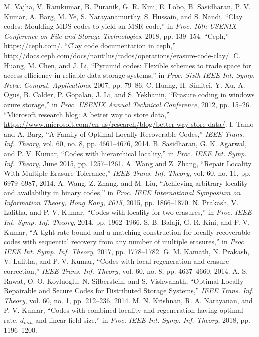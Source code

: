 \begin{multicols}{2}
\begin{thebibliography}{99}
 M. Vajha, V. Ramkumar, B. Puranik, G. R. Kini, E. Lobo, B. Sasidharan, P. V. Kumar, A. Barg, M. Ye, S. Narayanamurthy, S. Hussain, and S. Nandi, ``Clay codes: Moulding MDS codes to yield an MSR code,'' in \textit{Proc. 16th USENIX Conference on File and Storage Technologies}, 2018, pp. 139--154.
 ``Ceph,'' \url{https://ceph.com/}.
 ``Clay code documentation in ceph,'' \url{http://docs.ceph.com/docs/nautilus/rados/operations/erasure-code-clay/}.
 C. Huang, M. Chen, and J. Li, ``Pyramid codes: Flexible schemes to trade space for access efficiency in reliable data storage systems,'' in \textit{Proc. Sixth IEEE Int. Symp. Netw. Comput. Applications}, 2007, pp. 79--86.
 C. Huang, H. Simitci, Y. Xu, A. Ogus, B. Calder, P. Gopalan, J. Li, and S. Yekhanin, ``Erasure coding in windows azure storage,'' in \textit{Proc. USENIX Annual Technical Conference}, 2012, pp. 15--26.
 ``Microsoft research blog: A better way to store data,'' \url{https://www.microsoft.com/en-us/research/blog/better-way-store-data/}.
 I. Tamo and A. Barg, ``A Family of Optimal Locally Recoverable Codes,'' \textit{IEEE Trans. Inf. Theory}, vol. 60, no. 8, pp. 4661--4676, 2014.
 B. Sasidharan, G. K. Agarwal, and P. V. Kumar, ``Codes with hierarchical locality,'' in \textit{Proc. IEEE Int. Symp. Inf. Theory}, June 2015, pp. 1257--1261.
 A. Wang and Z. Zhang, ``Repair Locality With Multiple Erasure Tolerance,'' \textit{IEEE Trans. Inf. Theory}, vol. 60, no. 11, pp. 6979--6987, 2014.
 A. Wang, Z. Zhang, and M. Liu, ``Achieving arbitrary locality and availability in binary codes,'' in \textit{Proc. IEEE International Symposium on Information Theory, Hong Kong, 2015}, 2015, pp. 1866--1870.
 N. Prakash, V. Lalitha, and P. V. Kumar, ``Codes with locality for two erasures,'' in \textit{Proc. IEEE Int. Symp. Inf. Theory}, 2014, pp. 1962--1966.
 S. B. Balaji, G. R. Kini, and P. V. Kumar, ``A tight rate bound and a matching construction for locally recoverable codes with sequential recovery from any number of multiple erasures,'' in \textit{Proc. IEEE Int. Symp. Inf. Theory}, 2017, pp. 1778--1782.
 G. M. Kamath, N. Prakash, V. Lalitha, and P. V. Kumar, ``Codes with local regeneration and erasure correction,'' \textit{IEEE Trans. Inf. Theory}, vol. 60, no. 8, pp. 4637--4660, 2014.
 A. S. Rawat, O. O. Koyluoglu, N. Silberstein, and S. Vishwanath, ``Optimal Locally Repairable and Secure Codes for Distributed Storage Systems,'' \textit{IEEE Trans. Inf. Theory}, vol. 60, no. 1, pp. 212--236, 2014.
 M. N. Krishnan, R. A. Narayanan, and P. V. Kumar, ``Codes with combined locality and regeneration having optimal rate, $d_{min}$ and linear field size,'' in \textit{Proc. IEEE Int. Symp. Inf. Theory}, 2018, pp. 1196--1200.
\end{thebibliography}
\end{multicols}

